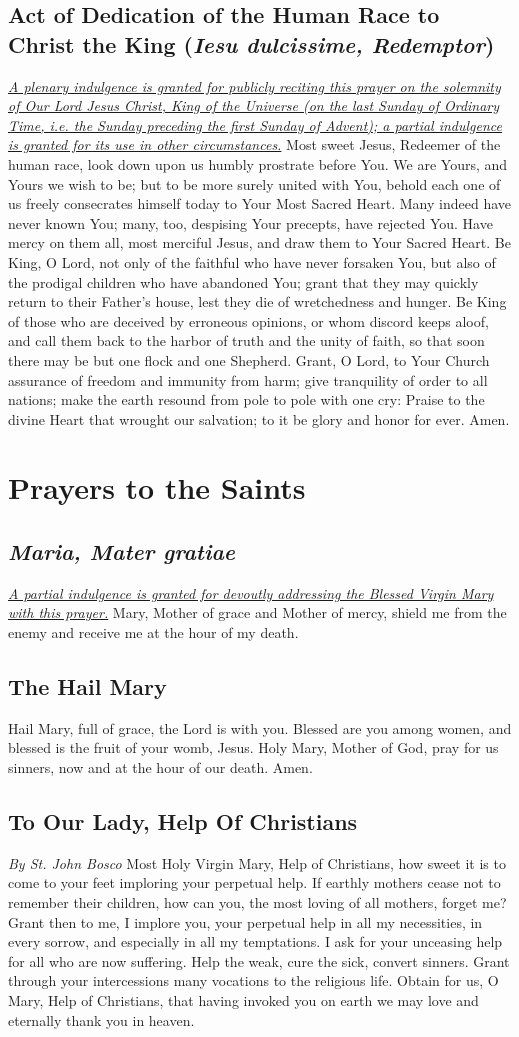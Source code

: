 \documentclass[12pt]{article}
\newcommand{\prayersection}[1]{\section{#1}}
\newcommand{\prayertitle}[1]{\subsection{#1}}
\newcommand{\indulgencedprayertitle}[1]{\prayertitle{#1 \protect\kreuz}}
\newcommand{\emphasis}[1]{\emph{#1}}
\newcommand{\emphasis}[1]{\textsl{#1}}
\newcommand{\foreign}[1]{\emphasis{#1}}
\newcommand{\note}[1]{{\small{\emphasis{#1}}}\newline}
\newcommand{\linkednote}[2]{\hyperlink{#1}{\note{#2}}}
\begin{document}
\indulgencedprayertitle{Act of Dedication of the Human Race to Christ the King (\foreign{Iesu dulcissime, Redemptor})}
\linkednote{grant2}{A plenary indulgence is granted for publicly reciting this prayer on the solemnity of Our Lord Jesus Christ, King of the Universe (on the last Sunday of Ordinary Time, i.e. the Sunday preceding the first Sunday of Advent);
a partial indulgence is granted for its use in other circumstances.}
Most sweet Jesus, Redeemer of the human race, look down upon us humbly prostrate before You.
We are Yours, and Yours we wish to be;
but to be more surely united with You, behold each one of us freely consecrates himself today to Your Most Sacred Heart.
Many indeed have never known You;
many, too, despising Your precepts, have rejected You.
Have mercy on them all, most merciful Jesus, and draw them to Your Sacred Heart.
Be King, O Lord, not only of the faithful who have never forsaken You, but also of the prodigal children who have abandoned You;
grant that they may quickly return to their Father's house, lest they die of wretchedness and hunger.
Be King of those who are deceived by erroneous opinions, or whom discord keeps aloof, and call them back to the harbor of truth and the unity of faith, so that soon there may be but one flock and one Shepherd.
Grant, O Lord, to Your Church assurance of freedom and immunity from harm;
give tranquility of order to all nations;
make the earth resound from pole to pole with one cry:
Praise to the divine Heart that wrought our salvation;
to it be glory and honor for ever.
Amen.

\newpage

\prayersection{Prayers to the Saints}
\indulgencedprayertitle{\foreign{Maria, Mater gratiae}}
\linkednote{grant17}{A partial indulgence is granted for devoutly addressing the Blessed Virgin Mary with this prayer.}
Mary, Mother of grace and Mother of mercy, shield me from the enemy and receive me at the hour of my death.

\prayertitle{The Hail Mary}
Hail Mary, full of grace, the Lord is with you.
Blessed are you among women, and blessed is the fruit of your womb, Jesus.
Holy Mary, Mother of God, pray for us sinners, now and at the hour of our death.
Amen.

\prayertitle{To Our Lady, Help Of Christians}
\label{prayer:Our_Lady_help_of_Christians}
\note{By St. John Bosco}
Most Holy Virgin Mary, Help of Christians, how sweet it is to come to your feet
imploring your perpetual help.
If earthly mothers cease not to remember their children, how can you, the most loving of all mothers, forget me?
Grant then to me, I implore you, your perpetual help in all my necessities, in every sorrow, and especially in all my temptations.
I ask for your unceasing help for all who are now suffering.
Help the weak, cure the sick, convert sinners.
Grant through your intercessions many vocations to the religious life.
Obtain for us, O Mary, Help of Christians, that having invoked you on earth we may love and eternally thank you in heaven.
\end{document}
